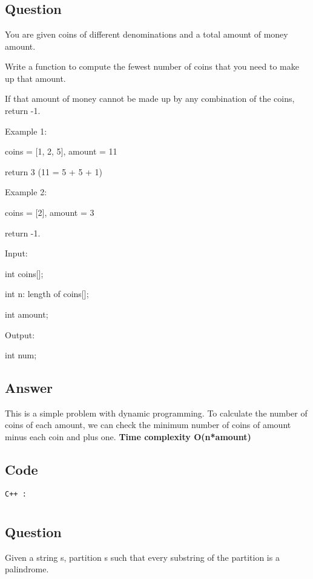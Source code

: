 \section{}
\subsection{Question}
You are given coins of different denominations and a total amount of money amount.

Write a function to compute the fewest number of coins that you need to make up that amount.

If that amount of money cannot be made up by any combination of the coins, return -1.

Example 1:

coins = [1, 2, 5], amount = 11

return 3 (11 = 5 + 5 + 1)

Example 2:

coins = [2], amount = 3

return -1.

Input:

int coins[];

int n: length of coins[];

int amount;

Output:

int num;

\subsection{Answer}
This is a simple problem with dynamic programming. To calculate the number of coins of each amount, we can check the minimum number of coins of amount minus each coin and plus one.  
\textbf{\color{red}Time complexity O(n*amount)}

\subsection{Code}
\texttt{C++ :}


\newpage
\section{}
\subsection{Question}
Given a string s, partition s such that every substring of the partition is a palindrome.

